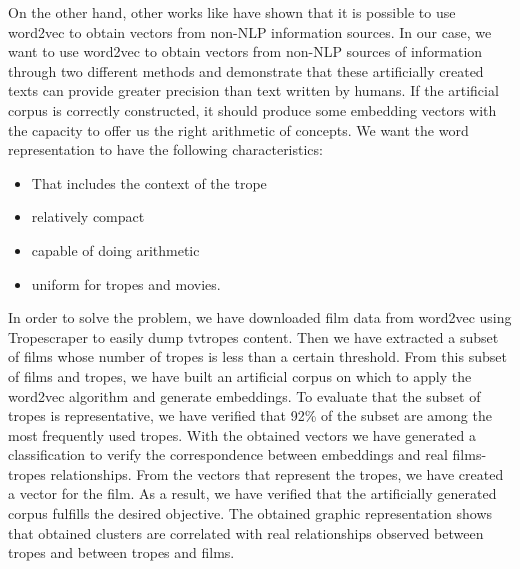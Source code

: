 \documentclass[letterpaper]{article}
\begin{document}
	
	On the other hand, other works like \cite{kazama2018} have shown that it is possible to use word2vec to obtain vectors from non-NLP information sources. In our case, we want to use word2vec to obtain vectors from non-NLP sources of information through two different methods and demonstrate that these artificially created texts can provide greater precision than text written by humans. If the artificial corpus is correctly constructed, it should produce some embedding vectors with the capacity to offer us the right arithmetic of concepts. We want the word representation to have the following characteristics: 
	
	\begin{itemize}

	\item That includes the context of the trope
	\item relatively compact
	\item capable of doing arithmetic
	\item uniform for tropes and movies.
		
    \end{itemize}  
	   

    In order to solve the problem, we have downloaded film data from word2vec using Tropescraper \cite{doi:10.1111/exsy.12525} to easily dump tvtropes content.
     Then we have extracted a subset of films whose number of tropes is less than a certain threshold. From this subset of films and tropes, we have built an artificial corpus on which to apply the word2vec algorithm and generate embeddings. To evaluate that the subset of tropes is representative, we have verified that 92\% of the subset are among the most frequently used tropes. With the obtained vectors we have generated a classification to verify the correspondence between embeddings and real films-tropes relationships. From the vectors that represent the tropes, we have created a vector for the film. As a result, we have verified that the artificially generated corpus fulfills the desired objective. The obtained graphic representation shows that obtained clusters are correlated with real relationships observed between tropes and between tropes and films.\\
 
\end{document}
